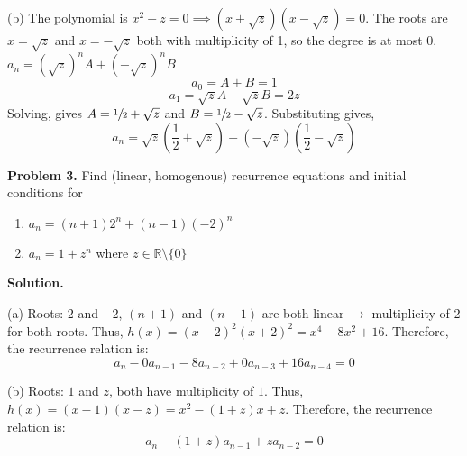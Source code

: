 (b) The polynomial is $ x^2-z=0\implies (x+\sqrt{z})(x-\sqrt{z})=0 $.
The roots are $ x=\sqrt{z} $ and $ x=-\sqrt{z} $ both with multiplicity of 1,
so the degree is at most $ 0 $.
$ a_n=(\sqrt{z})^n A + (-\sqrt{z})^n B $
\[ a_0=A+B=1\]
\[ a_1=\sqrt{z}A -\sqrt{z}B=2z \]
Solving, gives $ A=\sfrac{1}{2} +\sqrt{z} $ and $ B=\sfrac{1}{2} -\sqrt{z} $.
Substituting gives,
\[ a_n=\sqrt{z}\left(\frac{1}{2} +\sqrt{z}\right)
    +(-\sqrt{z})\left(\frac{1}{2} -\sqrt{z}\right) \]


\textbf{Problem 3.} Find (linear, homogenous) recurrence equations and initial
conditions for
\begin{enumerate}[label=(\alph*)]
    \item $ a_n=(n+1)2^n+(n-1)(-2)^n $
    \item $ a_n=1+z^n $ where $ z\in\mathbb{R}\setminus \{0\} $
\end{enumerate}

\textbf{Solution.}

(a) Roots: $ 2 $ and $ -2 $, $ (n+1) $ and $ (n-1) $ are both linear
$ \rightarrow $ multiplicity of 2 for both
roots. Thus, $ h(x)=(x-2)^2(x+2)^2=x^4-8x^2+16 $. Therefore, the recurrence
relation is:
\[ a_n-0 a_{n-1}-8a_{n-2}+0 a_{n-3}+16a_{n-4}=0 \]

(b) Roots: $ 1 $ and $ z $, both have multiplicity of $ 1 $. Thus,
$ h(x)=(x-1)(x-z)=x^2-(1+z)x+z $. Therefore, the recurrence relation is:
\[ a_n-(1+z)a_{n-1}+z a_{n-2}=0 \]
